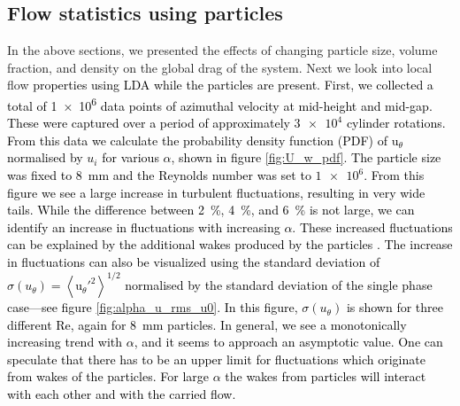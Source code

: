 \documentclass{jfm}
\newcommand\rey{\text{Re}}
\newcommand{\red}[1]{\textcolor{black}{#1}}
\begin{document}
\subsection{Flow statistics using particles} 
In the above sections, we presented the effects of changing particle size,
volume fraction, and density on the global drag of the system. Next we look
into local flow
\red{
properties using LDA while the particles are present.  First, we collected a
total of \num{1e6} data points of azimuthal velocity at mid-height and
mid-gap.  These were captured over a period of approximately $\num{3e4}$
cylinder rotations. From this data we calculate the probability density
function (PDF) of $\text{u}_\theta$ normalised by $u_i$ for various $\alpha$,
shown in figure \ref{fig:U_w_pdf}. The particle size was fixed to
\SI{8}{\milli\metre} and the Reynolds number was set to $\num{1e6}$. From this
figure we see a large increase in turbulent fluctuations, resulting in very
wide tails. While the difference between \SI{2}{\percent}, \SI{4}{\percent},
and \SI{6}{\percent} is not large, we can identify an increase in fluctuations
with increasing $\alpha$. These increased fluctuations can be explained by the
additional wakes produced by the particles \citep{Poelma2007,Almeras2017}. The
increase in fluctuations can also be visualized using the standard deviation
of $\sigma(u_\theta) = \left< \text{u}_\theta'^2 \right>^{1/2}$ normalised by
the standard deviation of the single phase case---see figure
\ref{fig:alpha_u_rms_u0}. In this figure, $\sigma(u_\theta)$ is shown for
three different $\rey$, again for \SI{8}{\milli\metre} particles. In general,
we see a monotonically increasing trend with $\alpha$, and it seems to
approach an asymptotic value. One can speculate that there has to be an upper
limit for fluctuations which originate from wakes of the particles. For large
$\alpha$ the wakes from particles will interact with each other and with the
carried flow.}
\end{document}
